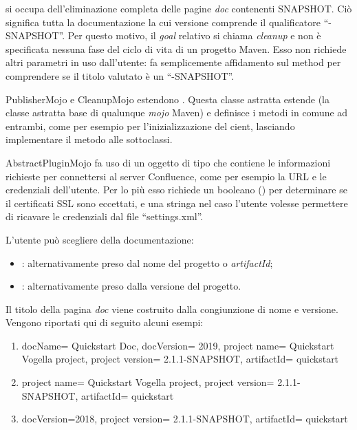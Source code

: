  si occupa dell'eliminazione completa delle pagine \emph{doc} contenenti SNAPSHOT.
Ciò significa tutta la documentazione la cui versione comprende il qualificatore ``-SNAPSHOT''.
Per questo motivo, il \emph{goal} relativo si chiama \emph{cleanup} e non è specificata nessuna fase del ciclo di vita di un progetto Maven.
Esso non richiede altri parametri in uso dall'utente: fa semplicemente affidamento sul method  per comprendere se il titolo valutato è un ``-SNAPSHOT''.

PublisherMojo e CleanupMojo estendono .
Questa classe astratta estende  (la classe astratta base di qualunque \emph{mojo} Maven) e definisce i metodi in comune ad entrambi, come per esempio  per l'inizializzazione del cient, lasciando implementare il metodo  alle sottoclassi.

AbstractPluginMojo fa uso di un oggetto di tipo che contiene le informazioni richieste per connettersi al server Confluence, come per esempio la URL e le credenziali dell'utente.
Per lo più esso richiede un booleano () per determinare se il certificati SSL sono eccettati, e una stringa  nel caso l'utente volesse permettere di ricavare le credenziali dal file ``settings.xml''.




L'utente può scegliere della documentazione:
	\begin{itemize}
		\item {}: alternativamente preso dal nome del progetto o \emph{artifactId};
		\item {}: alternativamente preso dalla versione del progetto.
	\end{itemize} 
Il titolo della pagina \emph{doc} viene costruito dalla congiunzione di nome e versione.
Vengono riportati qui di seguito alcuni esempi:
	\begin{enumerate}
		\item docName= Quickstart Doc, docVersion= 2019, project name= Quickstart Vogella project, project version= 2.1.1-SNAPSHOT, artifactId= quickstart
		\item project name= Quickstart Vogella project, project version= 2.1.1-SNAPSHOT,  artifactId= quickstart
		\item docVersion=2018, project version= 2.1.1-SNAPSHOT,  artifactId= quickstart
	\end{enumerate}

